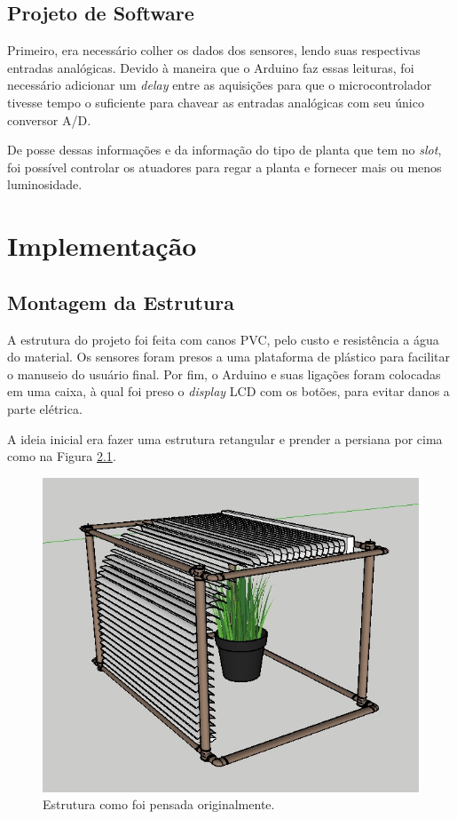 \documentclass[a4paper,12pt]{report}
\begin{document}
	\section{Projeto de Software}
	Primeiro, era necessário colher os dados dos sensores, lendo suas respectivas entradas analógicas. Devido à maneira que o Arduino faz essas leituras, foi necessário adicionar um \textit{delay} entre as aquisições para que o microcontrolador tivesse tempo o suficiente para chavear as entradas analógicas com seu único conversor A/D.
	
	De posse dessas informações e da informação do tipo de planta que tem no \textit{slot}, foi possível controlar os atuadores para regar a planta e fornecer mais ou menos luminosidade.
	

\cleardoublepage
\chapter{Implementação}
	\label{cap:Implementacao}

\section{Montagem da Estrutura}
	\label{sec:montagem}
	A estrutura do projeto foi feita com canos PVC, pelo custo e resistência a água do material. Os sensores foram presos a uma plataforma de plástico para facilitar o manuseio do usuário final. Por fim, o Arduino e suas ligações foram colocadas em uma caixa, à qual foi preso o \textit{display} LCD com os botões, para evitar danos a parte elétrica.
	
	A ideia inicial era fazer uma estrutura retangular e prender a persiana por cima como na Figura \ref{fig:estru0}.
	
	\begin{figure}[!h]
	\centering
	\includegraphics[width=0.7\linewidth]{figs/estru0}
	\caption{Estrutura como foi pensada originalmente.}
	\label{fig:estru0}
	\end{figure}
\end{document}
